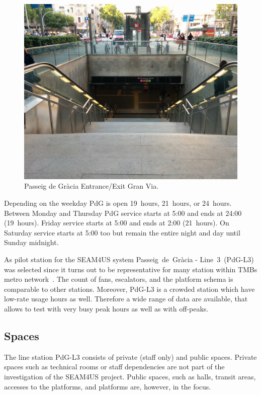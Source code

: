 \begin{figure}[htbp]
  \centering
  \includegraphics[width=\linewidth]{Figures/PdG-L3_entranceExit.jpg} 
  \caption{Passeig de Gr\`{a}cia Entrance/Exit Gran Via. \cite{TMB_2014}}
  \label{fig:PdG_entranceExit}
\end{figure}

Depending on the weekday PdG is open 19~hours, 21~hours, or 24~hours. Between Monday and Thursday PdG service starts at 5:00 and ends at 24:00 (19~hours). Friday service starts at 5:00 and ends at 2:00 (21~hours). On Saturday service starts at 5:00 too but remain the entire night and day until Sunday midnight.

As pilot station for the SEAM4US system Passeig~de~Gr\`{a}cia - Line~3~(PdG-L3) was selected since it turns out to be representative for many station within TMBs metro network~\cite{TMB_2014}. The count of fans, escalators, and the platform schema is comparable to other stations. Moreover, PdG-L3 is a crowded station which have low-rate usage hours as well. Therefore a wide range of data are available, that allows to test with very busy peak hours as well as with off-peaks.


\subsection{Spaces}
\label{subsec:PdG-L3_spaces}

The line station PdG-L3 consists of private (staff only) and public spaces. Private spaces such as technical rooms or staff dependencies are not part of the investigation of the SEAM4US project. Public spaces, such as halls, transit areas, accesses to the platforms, and platforms are, however, in the focus.

